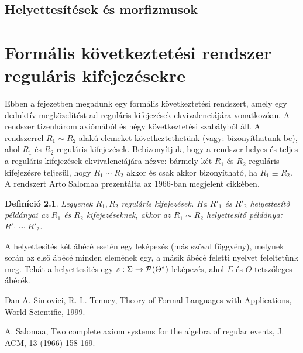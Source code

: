\documentclass[12pt]{report}
\newtheorem{defi}[tét]{Definíció}
\theoremstyle{definition}
\newcommand{\rk}[1]{reguláris kifejezés#1}
\begin{document}
\section{Helyettesítések és morfizmusok}

\chapter{Formális következtetési rendszer \rk{ekre}}

Ebben a fejezetben megadunk egy formális következtetési rendszert, amely egy deduktív megközelítést ad \rk{ek} ekvivalenciájára vonatkozóan.   A rendszer tizenhárom axiómából és négy következtetési szabályból áll. A rendszerrel $R_1\sim R_2$ alakú elemeket következtethetünk (vagy: bizonyíthatunk be), ahol $R_1$ és $R_2$ \rk{ek}. Bebizonyítjuk, hogy a rendszer helyes és teljes a \rk{ek} ekvivalenciájára nézve:
bármely két $R_1$ és $R_2$ reguláris kifejezésre teljesül, hogy $R_1\sim R_2$ akkor és csak akkor bizonyítható, ha $R_1\equiv R_2$.
A rendszert  Arto Salomaa prezentálta az 1966-ban megjelent \cite{Sal66} cikkében.

\begin{defi}
Legyenek $R_1,R_2$ \rk{ek}. Ha $R'_1$ és $R'_2$ helyettesítő példányai az $R_1$ és $R_2$ kifejezéseknek, akkor az $R_1\sim R_2$ helyettesítő példánya: $R'_1 \sim R'_2$.
\end{defi}


A helyettesítés két ábécé esetén egy leképezés (más szóval függvény), melynek során az első ábécé minden elemének egy, a másik ábécé feletti nyelvet feleltetünk meg. Tehát a helyettesítés egy  $s:\Sigma\to {\cal P}(\Theta^*)$ leképezés, ahol $\Sigma$ és $\Theta$ tetszőleges ábécék.


\begin{thebibliography}{10}
 Dan A. Simovici, R. L. Tenney, Theory of Formal Languages with Applications,
World Scientific, 1999.

 A. Salomaa, Two complete axiom systems for the algebra of regular events,
J. ACM, 13 (1966) 158-169.


\end{thebibliography}
\end{document}
